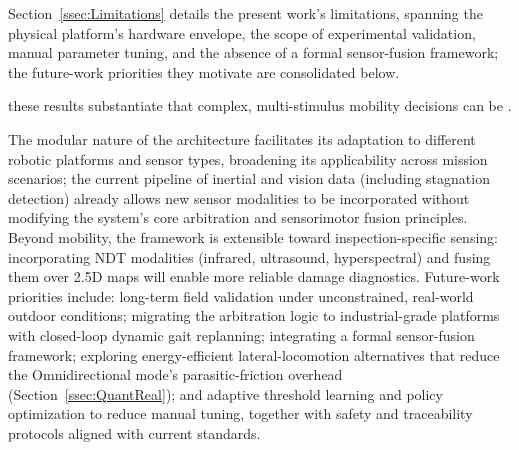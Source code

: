 Section~\ref{ssec:Limitations} details the present work's limitations, spanning the physical platform's hardware envelope, the scope of experimental validation, manual parameter tuning, and the absence of a formal sensor-fusion framework; the future-work priorities they motivate are consolidated below.

   these results substantiate that complex, multi-stimulus mobility decisions can be .

The modular nature of the architecture facilitates its adaptation to different robotic platforms and sensor types, broadening its applicability across mission scenarios; the current pipeline of inertial and vision data (including stagnation detection) already allows new sensor modalities to be incorporated without modifying the system's core arbitration and sensorimotor fusion principles. Beyond mobility, the framework is extensible toward inspection-specific sensing: incorporating NDT modalities (infrared, ultrasound, hyperspectral) and fusing them over 2.5D maps will enable more reliable damage diagnostics. Future-work priorities include: long-term field validation under unconstrained, real-world outdoor conditions; migrating the arbitration logic to industrial-grade platforms with closed-loop dynamic gait replanning; integrating a formal sensor-fusion framework; exploring energy-efficient lateral-locomotion alternatives that reduce the Omnidirectional mode's parasitic-friction overhead (Section~\ref{ssec:QuantReal}); and adaptive threshold learning and policy optimization to reduce manual tuning, together with safety and traceability protocols aligned with current standards. 


